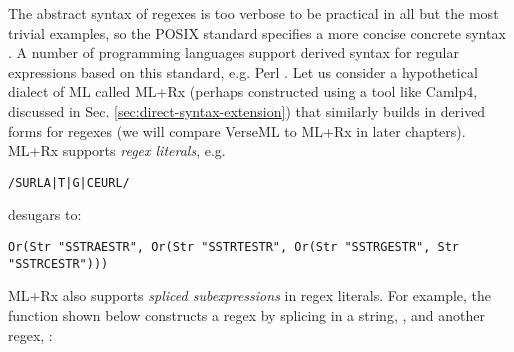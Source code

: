 The abstract syntax of regexes is too verbose to be practical  in all but the most trivial examples, so the POSIX standard specifies a more concise concrete syntax \cite{STD95954}. A number of programming languages support derived syntax for regular expressions based on this standard, e.g. Perl \cite{books/daglib/0028711}. Let us consider a hypothetical dialect of ML called ML+Rx (perhaps constructed using a tool like Camlp4, discussed in Sec. \ref{sec:direct-syntax-extension}) that similarly builds in derived forms for regexes (we will compare VerseML to ML+Rx in later chapters). ML+Rx supports \emph{regex literals}, e.g.
\begin{lstlisting}[numbers=none]
/SURLA|T|G|CEURL/
\end{lstlisting}
desugars to:
\begin{lstlisting}[numbers=none]
Or(Str "SSTRAESTR", Or(Str "SSTRTESTR", Or(Str "SSTRGESTR", Str "SSTRCESTR")))
\end{lstlisting}

ML+Rx also supports \emph{spliced subexpressions} in regex literals. For example, the function  shown below constructs a regex by splicing in a string, , and another regex, :

